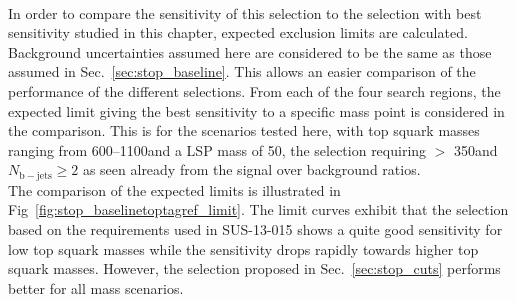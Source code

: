 \begin{table}[!h]
\centering
\caption{Signal over background ratios are displayed for two signal points labelled as (X, Y), where X is the top squark mass and Y is the LSP mass in GeV, in the four search regions defined in SUS-13-015.}
\label{tab:stop_ref_sel_soverb}
\end{table}  
\\
In order to compare the sensitivity of this selection to the selection with best sensitivity studied in this chapter, expected exclusion limits are calculated. Background uncertainties assumed here are considered to be the same as those assumed in Sec.~\ref{sec:stop_baseline}. This allows an easier comparison of the performance of the different selections. From each of the four search regions, the expected limit giving the best sensitivity to a specific mass point is considered in the comparison. This is for the scenarios tested here, with top squark masses ranging from 600--1100\gev and a LSP mass of 50\gev, the selection requiring \met $>$ 350\gev and $N_\mathrm{b-jets} \ge 2$ as seen already from the signal over background ratios. \\
The comparison of the expected limits is illustrated in Fig~\ref{fig:stop_baselinetoptagref_limit}. The limit curves exhibit that the selection based on the requirements used in SUS-13-015 shows a quite good sensitivity for low top squark masses while the sensitivity drops rapidly towards higher top squark masses. However, the selection proposed in Sec.~\ref{sec:stop_cuts} performs better for all mass scenarios. 
